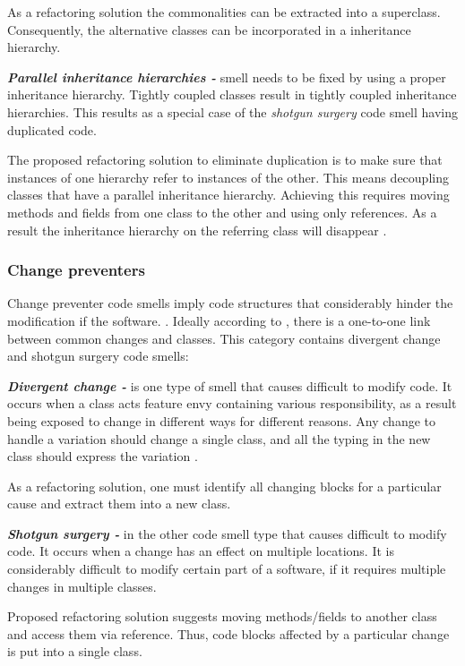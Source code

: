 As a refactoring solution the commonalities can be extracted into a superclass. Consequently, the alternative classes can be incorporated in a inheritance hierarchy.

\textit{\textbf{Parallel inheritance hierarchies -}} smell needs to be fixed by using a proper inheritance hierarchy. Tightly coupled classes result in tightly coupled inheritance hierarchies. This results as a special case of the \textit{shotgun surgery} code smell having duplicated code\cite{fowlerRefactor}. 

The proposed refactoring solution to eliminate duplication is to make sure that instances of one hierarchy refer to instances of the other. This means decoupling classes that have a parallel inheritance hierarchy. Achieving this requires moving methods and fields from one class to the other and using only references. As a result the inheritance hierarchy on the referring class will disappear \cite{fowlerRefactor}.  

\subsubsection*{Change preventers}
Change preventer code smells imply code structures that considerably hinder the modification if the software.  \cite{mantylaTaxonomy}. Ideally according to \cite{fowlerRefactor}, there is a one-to-one link between common changes and classes. This category contains divergent change and shotgun surgery code smells:

\textit{\textbf{Divergent change -}} is one type of smell that causes difficult to modify code. It occurs when a class acts feature envy containing various responsibility, as a result being exposed to change in different ways for different reasons. Any change to handle a variation should change a single class, and all the typing in the new class should express the variation \cite{fowlerRefactor}.

As a refactoring solution, one must identify all changing blocks for a particular cause and extract them into a new class. 
 
\textit{\textbf{Shotgun surgery -}} in the other code smell type that causes difficult to modify code. It occurs when a change has an effect on multiple locations. It is considerably difficult to modify certain part of a software, if it requires multiple changes in multiple classes.

Proposed refactoring solution suggests moving methods/fields to another class and access them via reference. Thus, code blocks affected by a particular change is put into a single class. 

